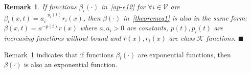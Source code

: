 \documentclass[journal]{IEEEtran}
\newcommand{\KK}{{\mathcal{K}}}
\newcommand{\VV}{{\mathcal{V}}}
\newtheorem{remark}{\bf Remark}[section]
\newcommand\oprocendsymbol{\hbox{$\blacksquare$}}
\newcommand\oprocend{\relax\ifmmode\else\unskip\hfill\fi\oprocendsymbol}
\begin{document}
\begin{remark}
If functions $\beta_i(\cdot)$ in~\eqref{ap-e12} for $\forall i \in {\VV}$ are $\beta_i(x,t) =a_i^{-p_i(t)}r_i(x)$, then $\beta(\cdot)$ in~\eqref{theoremeq1} is also in the same form: $\beta(x,t) =a^{-p(t)}r(x)$
where $a, a_i>0$ are constants, $p(t), p_i(t)$ are increasing functions without bound and $r(x), r_i(x)$ are class $\KK$ functions.
\oprocend
\label{remark:last}
\end{remark}
Remark~\ref{remark:last} indicates that if functions $\beta_i(\cdot)$ are exponential functions, then $\beta(\cdot)$ is also an exponential function.
 
\end{document}
